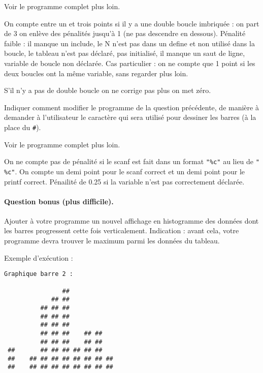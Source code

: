 \begin{correction}
Voir le programme complet plus loin.
\end{correction}
\begin{baremeenv}
   On compte entre un et trois points si il y a une double boucle imbriquée : on part de 3 on enlève des pénalités jusqu'à 1 (ne pas descendre en dessous). Pénalité faible : il manque un include,  le N n'est pas dans un define et non utilisé dans la boucle, le tableau n'est pas déclaré, pas initialisé, il manque un saut de ligne, variable de boucle non déclarée. Cas particulier : on ne compte que 1 point si les deux boucles ont la même variable, sans regarder plus loin.

S'il n'y a pas de double boucle on ne corrige pas plus on met zéro.
\end{baremeenv}

\question
Indiquer comment modifier le programme de la question précédente, de manière à demander à l'utilisateur le caractère qui sera utilisé pour dessiner les barres (à la place du \verb+#+).

\begin{correction}
Voir le programme complet plus loin.
\end{correction}
\begin{baremeenv}
    On ne compte pas de pénalité si le scanf est fait dans un format \verb+"%c"+ au lieu de \verb+" %c"+.  On compte un demi point pour le scanf correct et un demi point pour le printf correct. Pénailité de 0.25 si la variable n'est pas correctement déclarée. 
\end{baremeenv}

\paragraph{Question bonus (plus difficile).}
Ajouter à votre programme un nouvel affichage en histogramme des données dont les barres progressent cette fois verticalement. Indication : avant cela, votre programme devra trouver le maximum parmi les données du tableau.

Exemple d'exécution :
\begin{small}
\begin{verbatim}
Graphique barre 2 :

                ##            
             ## ##            
          ## ## ##            
          ## ## ##            
          ## ## ##            
          ## ## ##    ## ##   
          ## ## ##    ## ##   
 ##       ## ## ## ## ## ##   
 ##    ## ## ## ## ## ## ## ##
 ##    ## ## ## ## ## ## ## ##
\end{verbatim}

\end{small}

